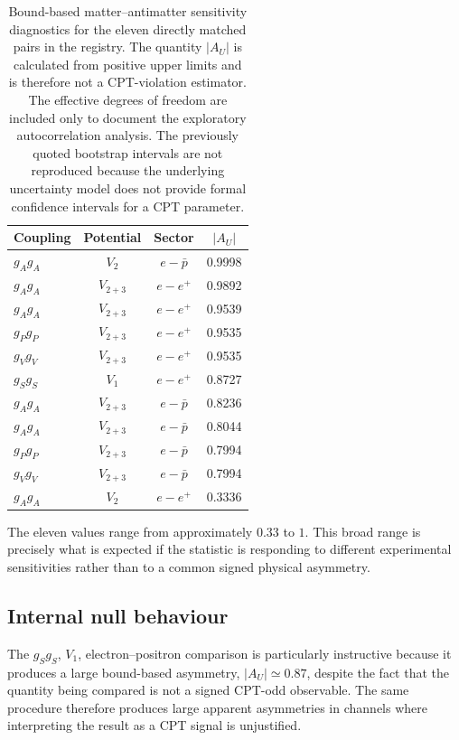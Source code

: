 \documentclass[aps,prd,reprint,superscriptaddress,nofootinbib]{revtex4-2}
\begin{document}
	\begin{table}[t]
		\caption{Bound-based matter--antimatter sensitivity diagnostics for the
			eleven directly matched pairs in the registry. The quantity $|A_U|$
			is calculated from positive upper limits and is therefore not a
			CPT-violation estimator. The effective degrees of freedom are included
			only to document the exploratory autocorrelation analysis. The
			previously quoted bootstrap intervals are not reproduced because the
			underlying uncertainty model does not provide formal confidence
			intervals for a CPT parameter.}
		\label{tab:asymmetry}
		\begin{ruledtabular}
			\begin{tabular}{lccc}
				Coupling & Potential & Sector & $|A_U|$ \\
				\hline
				$g_Ag_A$ & $V_2$ & $e-\bar p$ & 0.9998\\
				$g_Ag_A$ & $V_{2+3}$ & $e-e^+$ & 0.9892\\
				$g_Ag_A$ & $V_{2+3}$ & $e-e^+$ & 0.9539\\
				$g_Pg_P$ & $V_{2+3}$ & $e-e^+$ & 0.9535\\
				$g_Vg_V$ & $V_{2+3}$ & $e-e^+$ & 0.9535\\
				$g_Sg_S$ & $V_1$ & $e-e^+$ & 0.8727\\
				$g_Ag_A$ & $V_{2+3}$ & $e-\bar p$ & 0.8236\\
				$g_Ag_A$ & $V_{2+3}$ & $e-\bar p$ & 0.8044\\
				$g_Pg_P$ & $V_{2+3}$ & $e-\bar p$ & 0.7994\\
				$g_Vg_V$ & $V_{2+3}$ & $e-\bar p$ & 0.7994\\
				$g_Ag_A$ & $V_2$ & $e-e^+$ & 0.3336
			\end{tabular}
		\end{ruledtabular}
	\end{table}
	
	The eleven values range from approximately $0.33$ to $1$. This broad
	range is precisely what is expected if the statistic is responding to
	different experimental sensitivities rather than to a common signed
	physical asymmetry.
	
	\subsection{Internal null behaviour}
	
	The $g_Sg_S$, $V_1$, electron--positron comparison is particularly
	instructive because it produces a large bound-based asymmetry,
	$|A_U|\simeq0.87$, despite the fact that the quantity being compared is
	not a signed CPT-odd observable. The same procedure therefore produces
	large apparent asymmetries in channels where interpreting the result as
	a CPT signal is unjustified.
	
\end{document}
